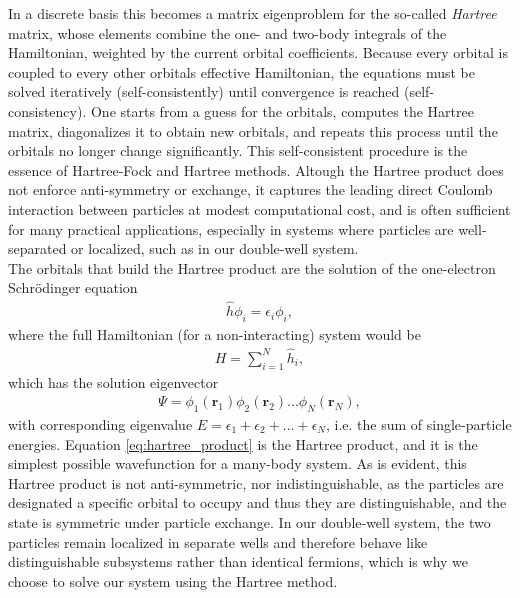 \documentclass{subfiles}
\begin{document}
In a discrete basis this becomes a matrix eigenproblem for the so-called \emph{Hartree} matrix, whose elements combine the one- and two-body integrals of the Hamiltonian, weighted by the current orbital coefficients. Because every orbital is coupled to every other orbitals effective Hamiltonian, the equations must be solved iteratively (self-consistently) until convergence is reached (self-consistency). One starts from a guess for the orbitals, computes the Hartree matrix, diagonalizes it to obtain new orbitals, and repeats this process until the orbitals no longer change significantly. This self-consistent procedure is the essence of Hartree-Fock and Hartree methods. Altough the Hartree product does not enforce anti-symmetry or exchange, it captures the leading direct Coulomb interaction between particles at modest computational cost, and is often sufficient for many practical applications, especially in systems where particles are well-separated or localized, such as in our double-well system.
\\
The orbitals that build the Hartree product are the solution of the one-electron Schrödinger equation 
\begin{align*}
    \hat{h}\phi_i = \epsilon_i\phi_i,
\end{align*}
where the full Hamiltonian (for a non-interacting) system would be 
\begin{align*}
    H = \sum_{i=1}^N \hat{h}_i,
\end{align*}
which has the solution eigenvector
\begin{align}
    \Psi = \phi_1(\mathbf{r}_1)\phi_2(\mathbf{r}_2)...\phi_N(\mathbf{r}_N)\label{eq:hartree_product},
\end{align}
with corresponding eigenvalue $E = \epsilon_1 + \epsilon_2 + ... + \epsilon_N$, i.e. the sum of single-particle energies. Equation \eqref{eq:hartree_product} is the Hartree product, and it is the simplest possible wavefunction for a many-body system. As is evident, this Hartree product is not anti-symmetric, nor indistinguishable, as the particles are designated a specific orbital to occupy and thus they are distinguishable, and the state is symmetric under particle exchange.
In our double-well system, the two particles remain localized in separate wells and therefore behave like distinguishable subsystems rather than identical fermions, which is why we choose to solve our system using the Hartree method.
\end{document}
